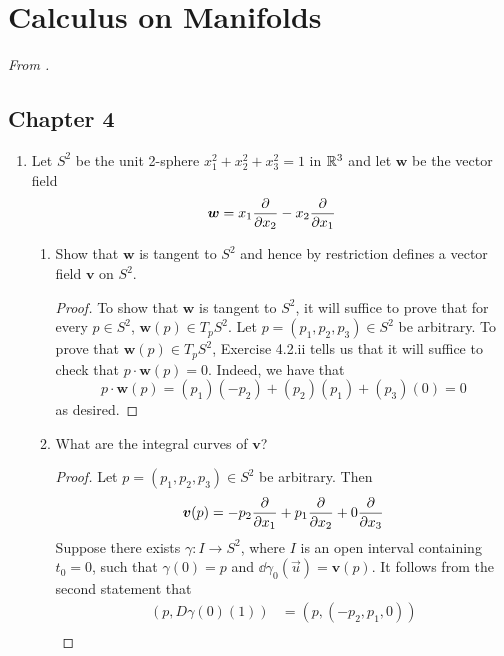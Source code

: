 \documentclass[../psets.tex]{subfiles}
\begin{document}
\section{Calculus on Manifolds}
\emph{From \textcite{bib:DifferentialForms}.}
\subsection*{Chapter 4}
\begin{enumerate}[label={\textbf{4.3.\roman*.}}]
    \item {}Let $S^2$ be the unit 2-sphere $x_1^2+x_2^2+x_3^2=1$ in $\mathbb{R}^3$ and let $\bm{w}$ be the vector field
    \begin{equation*}
        \bm{w} = x_1\pdv{x_2}-x_2\pdv{x_1}
    \end{equation*}
    \begin{enumerate}
        \item Show that $\bm{w}$ is tangent to $S^2$ and hence by restriction defines a vector field $\bm{v}$ on $S^2$.
        \begin{proof}
            To show that $\bm{w}$ is tangent to $S^2$, it will suffice to prove that for every $p\in S^2$, $\bm{w}(p)\in T_pS^2$. Let $p=(p_1,p_2,p_3)\in S^2$ be arbitrary. To prove that $\bm{w}(p)\in T_pS^2$, Exercise 4.2.ii tells us that it will suffice to check that $p\cdot\bm{w}(p)=0$. Indeed, we have that
            \begin{equation*}
                p\cdot\bm{w}(p) = (p_1)(-p_2)+(p_2)(p_1)+(p_3)(0)
                = 0
            \end{equation*}
            as desired.
        \end{proof}
        \item What are the integral curves of $\bm{v}$?
        \begin{proof}
            Let $p=(p_1,p_2,p_3)\in S^2$ be arbitrary. Then
            \begin{equation*}
                \bm{v}(p) = -p_2\pdv{x_1}+p_1\pdv{x_2}+0\pdv{x_3}
            \end{equation*}
            Suppose there exists $\gamma:I\to S^2$, where $I$ is an open interval containing $t_0=0$, such that $\gamma(0)=p$ and $\dd\gamma_0(\vec{u})=\bm{v}(p)$. It follows from the second statement that
            \begingroup
            \begin{align*}
                (p,D\gamma(0)(1)) &= (p,(-p_2,p_1,0))\\

\end{align*}
\end{proof}
\end{enumerate}
\end{enumerate}
\end{document}
